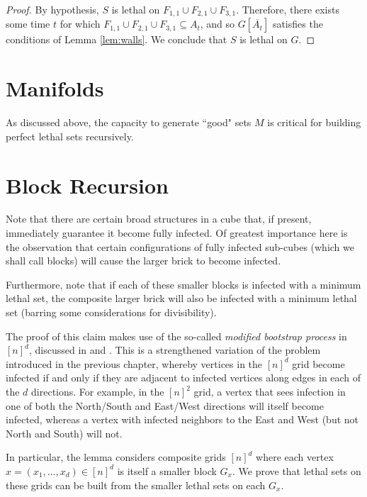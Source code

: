 \begin{proof}
By hypothesis, $S$ is lethal on $F_{1,1} \cup F_{2,1} \cup F_{3,1}$. Therefore, there exists some time $t$ for which $F_{1,1} \cup F_{2,1} \cup F_{3,1} \subseteq A_t$, and so $G[\overline{A_t}]$ satisfies the conditions of Lemma \ref{lem:walls}. We conclude that $S$ is lethal on $G$.
\end{proof}

\section{Manifolds}

As discussed above, the capacity to generate ``good" sets $M$ is critical for building perfect lethal sets recursively. 

\section{Block Recursion}

Note that there are certain broad structures in a cube that, if present, immediately guarantee it become fully infected. Of greatest importance here is the observation that certain configurations of fully infected sub-cubes (which we shall call blocks) will cause the larger brick to become infected. 


Furthermore, note that if each of these smaller blocks is infected with a minimum lethal set, the composite larger brick will also be infected with a minimum lethal set (barring some considerations for divisibility).

The proof of this claim makes use of the so-called \emph{modified bootstrap process} in $[n]^d$, discussed in \cite{some paper} and \cite{some other paper}. This is a strengthened variation of the problem introduced in the previous chapter, whereby vertices in the $[n]^d$ grid become infected if and only if they are adjacent to infected vertices along edges in each of the $d$ directions. For example, in the $[n]^2$ grid, a vertex that sees infection in one of both the North/South and East/West directions will itself become infected, whereas a vertex with infected neighbors to the East and West (but not North and South) will not. 

In particular, the lemma considers composite grids $[n]^d$ where each vertex $x = (x_1, \dots, x_d) \in [n]^d$ is itself a smaller block $G_x$. We prove that lethal sets on these grids can be built from the smaller lethal sets on each $G_x$. 

